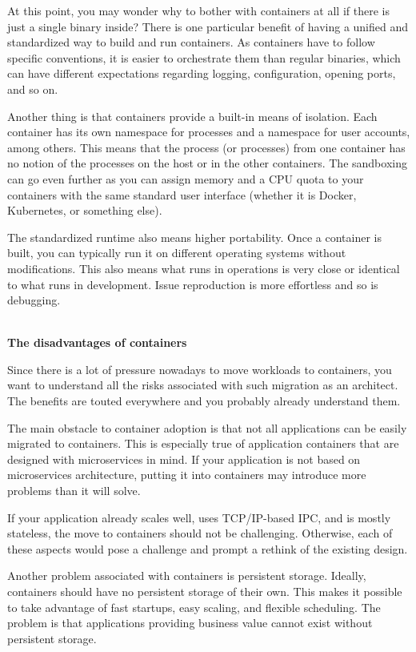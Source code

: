 At this point, you may wonder why to bother with containers at all if there is just a single binary inside? There is one particular benefit of having a unified and standardized way to build and run containers. As containers have to follow specific conventions, it is easier to orchestrate them than regular binaries, which can have different expectations regarding logging, configuration, opening ports, and so on.

Another thing is that containers provide a built-in means of isolation. Each container has its own namespace for processes and a namespace for user accounts, among others. This means that the process (or processes) from one container has no notion of the processes on the host or in the other containers. The sandboxing can go even further as you can assign memory and a CPU quota to your containers with the same standard user interface (whether it is Docker, Kubernetes, or something else). 

The standardized runtime also means higher portability. Once a container is built, you can typically run it on different operating systems without modifications. This also means what runs in operations is very close or identical to what runs in development. Issue reproduction is more effortless and so is debugging.

\hspace*{\fill} \\ %
\noindent
\textbf{The disadvantages of containers}

Since there is a lot of pressure nowadays to move workloads to containers, you want to understand all the risks associated with such migration as an architect. The benefits are touted everywhere and you probably already understand them.

The main obstacle to container adoption is that not all applications can be easily migrated to containers. This is especially true of application containers that are designed with microservices in mind. If your application is not based on microservices architecture, putting it into containers may introduce more problems than it will solve. 

If your application already scales well, uses TCP/IP-based IPC, and is mostly stateless, the move to containers should not be challenging. Otherwise, each of these aspects would pose a challenge and prompt a rethink of the existing design.

Another problem associated with containers is persistent storage. Ideally, containers should have no persistent storage of their own. This makes it possible to take advantage of fast startups, easy scaling, and flexible scheduling. The problem is that applications providing business value cannot exist without persistent storage.

